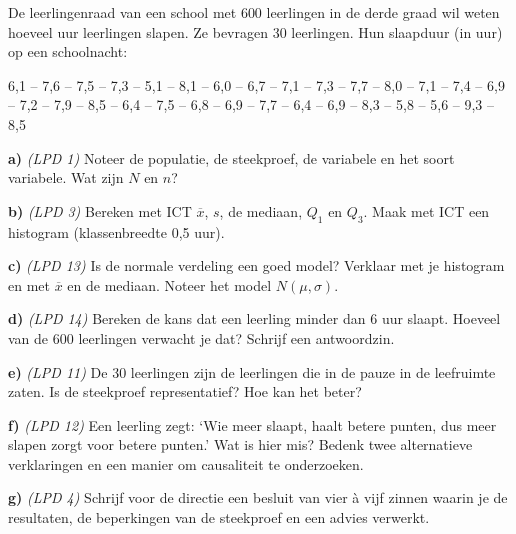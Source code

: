De leerlingenraad van een school met 600 leerlingen in de derde graad wil weten hoeveel uur leerlingen slapen. Ze bevragen 30 leerlingen. Hun slaapduur (in uur) op een schoolnacht:

6,1 – 7,6 – 7,5 – 7,3 – 5,1 – 8,1 – 6,0 – 6,7 – 7,1 – 7,3 – 7,7 – 8,0 – 7,1 – 7,4 – 6,9 – 7,2 – 7,9 – 8,5 – 6,4 – 7,5 – 6,8 – 6,9 – 7,7 – 6,4 – 6,9 – 8,3 – 5,8 – 5,6 – 9,3 – 8,5

\textbf{a)} \emph{(LPD 1)} Noteer de populatie, de steekproef, de variabele en het soort variabele. Wat zijn $N$ en $n$? \lijn

\textbf{b)} \emph{(LPD 3)} Bereken met ICT $\overline{x}$, $s$, de mediaan, $Q_1$ en $Q_3$. Maak met ICT een histogram (klassenbreedte 0,5 uur). \lijn

\textbf{c)} \emph{(LPD 13)} Is de normale verdeling een goed model? Verklaar met je histogram en met $\overline{x}$ en de mediaan. Noteer het model $N(\mu,\sigma)$. \lijn

\textbf{d)} \emph{(LPD 14)} Bereken de kans dat een leerling minder dan 6 uur slaapt. Hoeveel van de 600 leerlingen verwacht je dat? Schrijf een antwoordzin. \lijn

\textbf{e)} \emph{(LPD 11)} De 30 leerlingen zijn de leerlingen die in de pauze in de leefruimte zaten. Is de steekproef representatief? Hoe kan het beter? \lijn

\textbf{f)} \emph{(LPD 12)} Een leerling zegt: ‘Wie meer slaapt, haalt betere punten, dus meer slapen zorgt voor betere punten.’ Wat is hier mis? Bedenk twee alternatieve verklaringen en een manier om causaliteit te onderzoeken. \lijn

\textbf{g)} \emph{(LPD 4)} Schrijf voor de directie een besluit van vier à vijf zinnen waarin je de resultaten, de beperkingen van de steekproef en een advies verwerkt. \lijn

